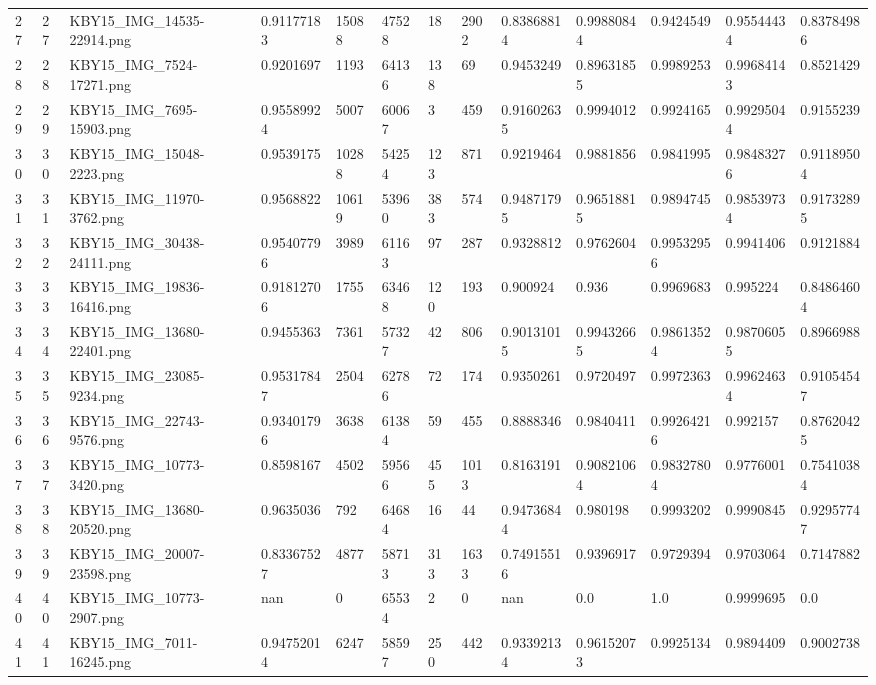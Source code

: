 \documentclass[11pt, a4paper, twoside]{report}
\begin{document}
\begin{longtable}[c]{@{}lllllllllllll@{}}
27 & 27 & KBY15\_IMG\_14535-22914.png & 0.91177183 & 15088 & 47528 & 18 & 2902 & 0.83868814 & 0.99880844 & 0.9424549 & 0.95544434 & 0.83784986 \\
28 & 28 & KBY15\_IMG\_7524-17271.png & 0.9201697 & 1193 & 64136 & 138 & 69 & 0.9453249 & 0.89631855 & 0.9989253 & 0.99684143 & 0.8521429 \\
29 & 29 & KBY15\_IMG\_7695-15903.png & 0.95589924 & 5007 & 60067 & 3 & 459 & 0.91602635 & 0.9994012 & 0.9924165 & 0.99295044 & 0.9155239 \\
30 & 30 & KBY15\_IMG\_15048-2223.png & 0.9539175 & 10288 & 54254 & 123 & 871 & 0.9219464 & 0.9881856 & 0.9841995 & 0.98483276 & 0.91189504 \\
31 & 31 & KBY15\_IMG\_11970-3762.png & 0.9568822 & 10619 & 53960 & 383 & 574 & 0.94871795 & 0.96518815 & 0.9894745 & 0.98539734 & 0.91732895 \\
32 & 32 & KBY15\_IMG\_30438-24111.png & 0.95407796 & 3989 & 61163 & 97 & 287 & 0.9328812 & 0.9762604 & 0.99532956 & 0.9941406 & 0.9121884 \\
33 & 33 & KBY15\_IMG\_19836-16416.png & 0.91812706 & 1755 & 63468 & 120 & 193 & 0.900924 & 0.936 & 0.9969683 & 0.995224 & 0.84864604 \\
34 & 34 & KBY15\_IMG\_13680-22401.png & 0.9455363 & 7361 & 57327 & 42 & 806 & 0.90131015 & 0.99432665 & 0.98613524 & 0.98706055 & 0.8966988 \\
35 & 35 & KBY15\_IMG\_23085-9234.png & 0.95317847 & 2504 & 62786 & 72 & 174 & 0.9350261 & 0.9720497 & 0.9972363 & 0.99624634 & 0.91054547 \\
36 & 36 & KBY15\_IMG\_22743-9576.png & 0.93401796 & 3638 & 61384 & 59 & 455 & 0.8888346 & 0.9840411 & 0.99264216 & 0.992157 & 0.87620425 \\
37 & 37 & KBY15\_IMG\_10773-3420.png & 0.8598167 & 4502 & 59566 & 455 & 1013 & 0.8163191 & 0.90821064 & 0.98327804 & 0.9776001 & 0.75410384 \\
38 & 38 & KBY15\_IMG\_13680-20520.png & 0.9635036 & 792 & 64684 & 16 & 44 & 0.94736844 & 0.980198 & 0.9993202 & 0.9990845 & 0.92957747 \\
39 & 39 & KBY15\_IMG\_20007-23598.png & 0.83367527 & 4877 & 58713 & 313 & 1633 & 0.74915516 & 0.9396917 & 0.9729394 & 0.9703064 & 0.7147882 \\
40 & 40 & KBY15\_IMG\_10773-2907.png & nan & 0 & 65534 & 2 & 0 & nan & 0.0 & 1.0 & 0.9999695 & 0.0 \\
41 & 41 & KBY15\_IMG\_7011-16245.png & 0.94752014 & 6247 & 58597 & 250 & 442 & 0.93392134 & 0.96152073 & 0.9925134 & 0.9894409 & 0.9002738 \\

\end{longtable}
\end{document}
